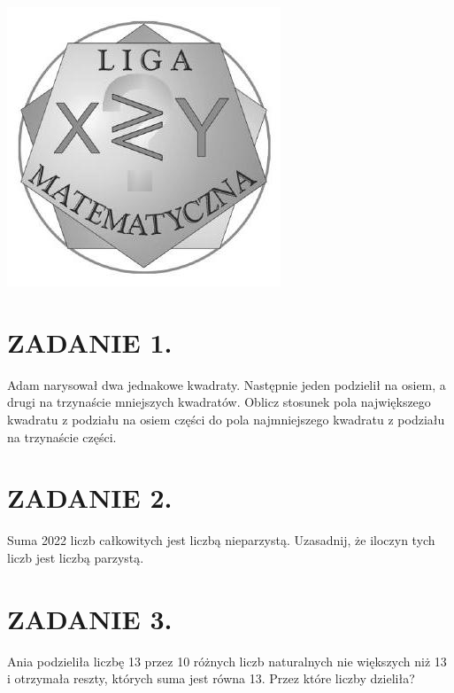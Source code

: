 \documentclass[10pt]{article}
\begin{document}
\begin{center}
\includegraphics[max width=\textwidth]{2024_11_21_8e657902b94da6e597c6g-1}
\end{center}



\section*{ZADANIE 1.}
Adam narysował dwa jednakowe kwadraty. Następnie jeden podzielił na osiem, a drugi na trzynaście mniejszych kwadratów. Oblicz stosunek pola największego kwadratu z podziału na osiem części do pola najmniejszego kwadratu z podziału na trzynaście części.

\section*{ZADANIE 2.}
Suma 2022 liczb całkowitych jest liczbą nieparzystą. Uzasadnij, że iloczyn tych liczb jest liczbą parzystą.

\section*{ZADANIE 3.}
Ania podzieliła liczbę 13 przez 10 różnych liczb naturalnych nie większych niż 13 i otrzymała reszty, których suma jest równa 13. Przez które liczby dzieliła?
\end{document}
